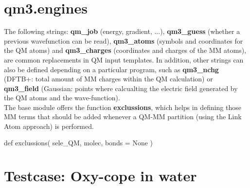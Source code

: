 \documentclass[10pt]{article}
\newcommand{\func}[1]{\textcolor{fcol}{\textbf{\fontspec{Anonymous Pro}#1}}}
\begin{document}
\section{qm3.engines}
The following strings: \textbf{qm\_job} (energy, gradient, ...), \textbf{qm3\_guess} (whether
a previous wavefunction can be read), \textbf{qm3\_atoms} (symbols and coordinates for the QM atoms) and
\textbf{qm3\_charges} (coordinates and charges of the MM atoms), are common replacements
in QM input templates. In addition, other strings can also be defined depending on a particular program,
such as \textbf{qm3\_nchg} (DFTB+: total amount of MM charges within the QM calculation)
or \textbf{qm3\_field} (Gaussian: points where calcualting the electric field generated by
the QM atoms and the wave-function).\\
The base module offers the function \func{exclussions}, which helps in defining those 
MM terms that should be added whenever a QM-MM partition (using the Link Atom approach) is performed.
\begin{pyglist}[language=python,fvset={frame=single}]
def exclussions( sele_QM, molec, bonds = None )
\end{pyglist}





























\section{Testcase: Oxy-cope in water}



\end{document}
